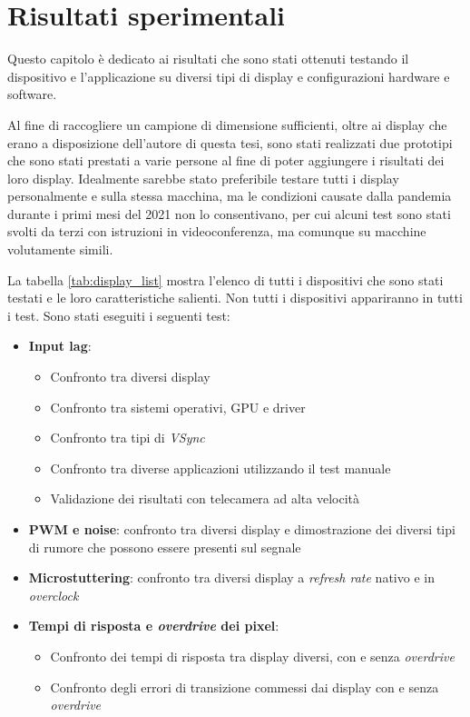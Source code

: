 \setlength{\parskip}{1em}
\setlength{\parindent}{0pt}
\chapter{Risultati sperimentali}
\label{chap:expdata}

Questo capitolo è dedicato ai risultati che sono stati ottenuti testando il dispositivo e l'applicazione su diversi tipi di display e configurazioni hardware e software.

Al fine di raccogliere un campione di dimensione sufficienti, oltre ai display che erano a disposizione dell'autore di questa tesi, sono stati realizzati due prototipi che sono stati prestati a varie persone al fine di poter aggiungere i risultati dei loro display. Idealmente sarebbe stato preferibile testare tutti i display personalmente e sulla stessa macchina, ma le condizioni causate dalla pandemia durante i primi mesi del 2021 non lo consentivano, per cui alcuni test sono stati svolti da terzi con istruzioni in videoconferenza, ma comunque su macchine volutamente simili.

La tabella \ref{tab:display_list} mostra l'elenco di tutti i dispositivi che sono stati testati e le loro caratteristiche salienti. Non tutti i dispositivi appariranno in tutti i test. Sono stati eseguiti i seguenti test:\begin{itemize}
	\item \textbf{Input lag}:\begin{itemize}
		\item Confronto tra diversi display
		\item Confronto tra sistemi operativi, GPU e driver
		\item Confronto tra tipi di \textit{VSync}
		\item Confronto tra diverse applicazioni utilizzando il test manuale
		\item Validazione dei risultati con telecamera ad alta velocità
	\end{itemize}
	\item \textbf{PWM e noise}: confronto tra diversi display e dimostrazione dei diversi tipi di rumore che possono essere presenti sul segnale
	\item \textbf{Microstuttering}: confronto tra diversi display a \textit{refresh rate} nativo e in \textit{overclock}
	\item \textbf{Tempi di risposta e \textit{overdrive} dei pixel}:\begin{itemize}
		\item Confronto dei tempi di risposta tra display diversi, con e senza \textit{overdrive}
		\item Confronto degli errori di transizione commessi dai display con e senza \textit{overdrive}
	\end{itemize}
\end{itemize}

